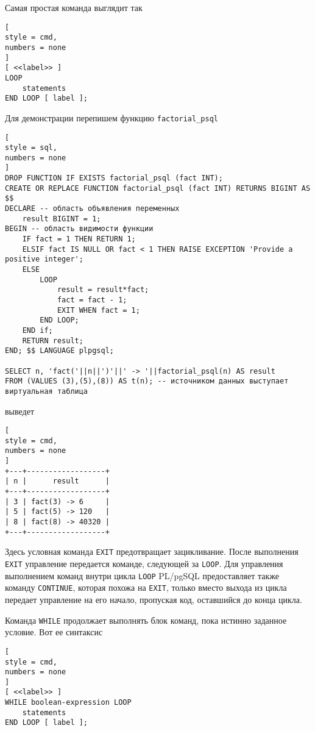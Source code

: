 \documentclass[%
	11pt,
	a4paper,
	utf8,
		]{article}
\begin{document}
Самая простая команда выглядит так
\begin{lstlisting}[
style = cmd,
numbers = none
]
[ <<label>> ]
LOOP
    statements
END LOOP [ label ];
\end{lstlisting}

Для демонстрации перепишем функцию \texttt{factorial\_psql}
\begin{lstlisting}[
style = sql,
numbers = none
]
DROP FUNCTION IF EXISTS factorial_psql (fact INT); 
CREATE OR REPLACE FUNCTION factorial_psql (fact INT) RETURNS BIGINT AS
$$
DECLARE -- область объявления переменных
    result BIGINT = 1;
BEGIN -- область видимости функции
    IF fact = 1 THEN RETURN 1;
    ELSIF fact IS NULL OR fact < 1 THEN RAISE EXCEPTION 'Provide a positive integer';
    ELSE
        LOOP
            result = result*fact;
            fact = fact - 1;
            EXIT WHEN fact = 1;
        END LOOP;
    END if;
    RETURN result;
END; $$ LANGUAGE plpgsql;

SELECT n, 'fact('||n||')'||' -> '||factorial_psql(n) AS result
FROM (VALUES (3),(5),(8)) AS t(n); -- источником данных выступает виртуальная таблица
\end{lstlisting}
выведет
\begin{lstlisting}[
style = cmd,
numbers = none
]
+---+------------------+
| n |      result      |
+---+------------------+
| 3 | fact(3) -> 6     |
| 5 | fact(5) -> 120   |
| 8 | fact(8) -> 40320 |
+---+------------------+
\end{lstlisting}

Здесь условная команда \texttt{EXIT} предотвращает зацикливание. После выполнения \texttt{EXIT} управление передается команде, следующей за \texttt{LOOP}. Для управления выполнением команд внутри цикла \texttt{LOOP} PL/pgSQL предоставляет также команду \texttt{CONTINUE}, которая похожа на \texttt{EXIT}, только вместо выхода из цикла передает управление на его начало, пропуская код, оставшийся до конца цикла.


Команда \texttt{WHILE} продолжает выполнять блок команд, пока истинно заданное условие. Вот ее синтаксис
\begin{lstlisting}[
style = cmd,
numbers = none
]
[ <<label>> ]
WHILE boolean-expression LOOP
    statements
END LOOP [ label ];
\end{lstlisting}
\end{document}
